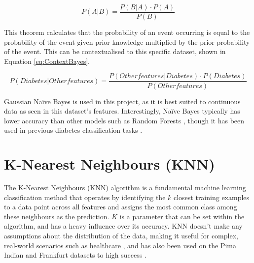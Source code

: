 \begin{equation}\label{eq:Bayes}
    P(A|B) = \frac{P(B|A) \cdot P(A)}{P(B)}
\end{equation}

\para This theorem calculates that the probability of an event occurring is equal to the probability of the event given 
prior knowledge multiplied by the prior probability of the event. This can be contextualised to this specific dataset, shown in Equation \ref{eq:ContextBayes}.

\begin{equation}\label{eq:ContextBayes}
    P(Diabetes | Other features) = \frac{P(Other features | Diabetes) \cdot P(Diabetes)}{P(Other features)}
\end{equation}

\para Gaussian Na\"ive Bayes is used in this project, as it is best suited to continuous data as seen in this dataset's 
features. Interestingly, Na\"ive Bayes typically has lower accuracy than other models such as Random Forests \autocite{khan_novel_2023},
though it has been used in previous diabetes classification tasks \autocite{aftab_cloud-based_2021, chang_pima_2023, zou_construction_2024}.

\section{K-Nearest Neighbours (KNN)}
The K-Nearest Neighbours (KNN) algorithm is a fundamental machine learning classification method that operates by identifying 
the $k$ closest training examples to a data point across all features and assigns the most common class among these neighbours 
as the prediction. $K$ is a parameter that can be set within the algorithm, and has a heavy influence over its accuracy.
KNN doesn't make any assumptions about the distribution of the data, making it useful for complex, real-world scenarios
such as healthcare \autocite{thomas_addressing_2021}, and has also been used on the Pima Indian and Frankfurt datasets
to high success \autocite{alzubi_diabetes_2023, zou_construction_2024}.

